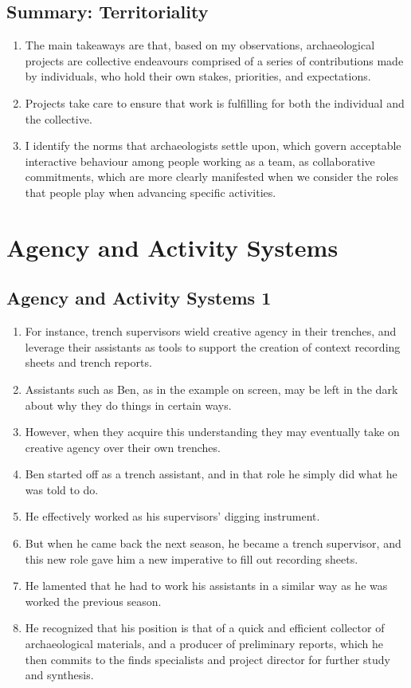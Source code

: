 \documentclass{article}
\begin{document}
\subsection{Summary: Territoriality}
\begin{enumerate}
  \item The main takeaways are that, based on my observations, archaeological projects are collective endeavours comprised of a series of contributions made by individuals, who hold their own stakes, priorities, and expectations.
  \item Projects take care to ensure that work is fulfilling for both the individual and the collective.
  \item I identify the norms that archaeologists settle upon, which govern acceptable interactive behaviour among people working as a team, as collaborative commitments, which are more clearly manifested when we consider the roles that people play when advancing specific activities.
\end{enumerate}

\section{Agency and Activity Systems}
\subsection{Agency and Activity Systems 1}
\begin{enumerate}
  \item For instance, trench supervisors wield creative agency in their trenches, and leverage their assistants as tools to support the creation of context recording sheets and trench reports.
  \item Assistants such as Ben, as in the example on screen, may be left in the dark about why they do things in certain ways.
  \item However, when they acquire this understanding they may eventually take on creative agency over their own trenches.
  \item Ben started off as a trench assistant, and in that role he simply did what he was told to do.
  \item He effectively worked as his supervisors' digging instrument.
  \item But when he came back the next season, he became a trench supervisor, and this new role gave him a new imperative to fill out recording sheets.
  \item He lamented that he had to work his assistants in a similar way as he was worked the previous season.
  \item He recognized that his position is that of a quick and efficient collector of archaeological materials, and a producer of preliminary reports, which he then commits to the finds specialists and project director for further study and synthesis.
\end{enumerate}
\end{document}
